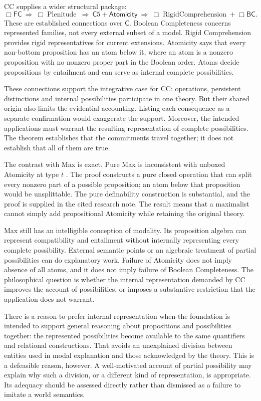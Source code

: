 \documentclass[11pt]{article}
\newcommand{\C}{\mathsf C}
\newcommand{\FC}{\mathsf{FC}}
\newcommand{\BC}{\mathsf{BC}}
\newcommand{\At}{\mathsf{Atomicity}}
\begin{document}
CC supplies a wider structural package:
\[
 \Box\FC\ \Longrightarrow\ \Box\operatorname{Plenitude}
 \ \Longrightarrow\ \C5+\At
 \ \Longrightarrow\ \Box\operatorname{RigidComprehension}+\Box\BC.
\]
These are established connections over $\C$. Boolean Completeness concerns represented families, not every external subset of a model. Rigid Comprehension provides rigid representatives for current extensions. Atomicity says that every non-bottom proposition has an atom below it, where an atom is a nonzero proposition with no nonzero proper part in the Boolean order. Atoms decide propositions by entailment and can serve as internal complete possibilities.

These connections support the integrative case for CC: operations, persistent distinctions and internal possibilities participate in one theory. But their shared origin also limits the evidential accounting. Listing each consequence as a separate confirmation would exaggerate the support. Moreover, the intended applications must warrant the resulting representation of complete possibilities. The theorem establishes that the commitments travel together; it does not establish that all of them are true.

The contrast with Max is exact. Pure Max is inconsistent with unboxed Atomicity at type $t$ \citep{maxatomicity}. The proof constructs a pure closed operation that can split every nonzero part of a possible proposition; an atom below that proposition would be unsplittable. The pure definability construction is substantial, and the proof is supplied in the cited research note. The result means that a maximalist cannot simply add propositional Atomicity while retaining the original theory.

Max still has an intelligible conception of modality. Its proposition algebra can represent compatibility and entailment without internally representing every complete possibility. External semantic points or an algebraic treatment of partial possibilities can do explanatory work. Failure of Atomicity does not imply absence of all atoms, and it does not imply failure of Boolean Completeness. The philosophical question is whether the internal representation demanded by CC improves the account of possibilities, or imposes a substantive restriction that the application does not warrant.

There is a reason to prefer internal representation when the foundation is intended to support general reasoning about propositions and possibilities together: the represented possibilities become available to the same quantifiers and relational constructions. That avoids an unexplained division between entities used in modal explanation and those acknowledged by the theory. This is a defeasible reason, however. A well-motivated account of partial possibility may explain why such a division, or a different kind of representation, is appropriate. Its adequacy should be assessed directly rather than dismissed as a failure to imitate a world semantics.
\end{document}

